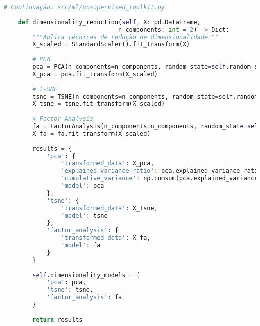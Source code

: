 \begin{pythonbox}
\begin{lstlisting}[language=Python]
# Continuação: src/ml/unsupervised_toolkit.py
    
    def dimensionality_reduction(self, X: pd.DataFrame, 
                                n_components: int = 2) -> Dict:
        """Aplica técnicas de redução de dimensionalidade"""
        X_scaled = StandardScaler().fit_transform(X)
        
        # PCA
        pca = PCA(n_components=n_components, random_state=self.random_state)
        X_pca = pca.fit_transform(X_scaled)
        
        # t-SNE
        tsne = TSNE(n_components=n_components, random_state=self.random_state)
        X_tsne = tsne.fit_transform(X_scaled)
        
        # Factor Analysis
        fa = FactorAnalysis(n_components=n_components, random_state=self.random_state)
        X_fa = fa.fit_transform(X_scaled)
        
        results = {
            'pca': {
                'transformed_data': X_pca,
                'explained_variance_ratio': pca.explained_variance_ratio_,
                'cumulative_variance': np.cumsum(pca.explained_variance_ratio_),
                'model': pca
            },
            'tsne': {
                'transformed_data': X_tsne,
                'model': tsne
            },
            'factor_analysis': {
                'transformed_data': X_fa,
                'model': fa
            }
        }
        
        self.dimensionality_models = {
            'pca': pca,
            'tsne': tsne,
            'factor_analysis': fa
        }
        
        return results
\end{lstlisting}
\end{pythonbox}
